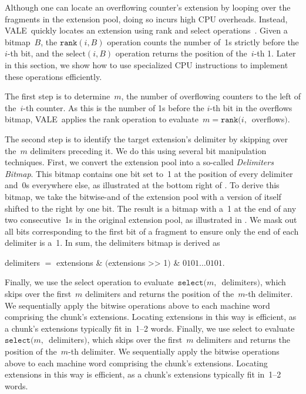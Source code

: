 \documentclass[sigconf]{acmart}
\newcommand{\counterencodingabbrv}{VALE}
\begin{document}
Although one can locate an overflowing counter's extension by looping over the
fragments in the extension pool, doing so incurs high CPU overheads. Instead,
\counterencodingabbrv\ quickly locates an extension using rank and select
operations~\cite{Poppy,FlorianRankandSelect,CompactPATTrees,RankandSelectDict,GQF}.
Given a bitmap~$B$, the $\texttt{rank}(i,B)$ operation counts the number of~1s
strictly before the $i$-th bit, and the $\text{select}(i,B)$ operation returns
the position of the~$i${\nobreakdash-}th 1. Later in this section, we show how
to use specialized CPU instructions to implement these operations efficiently. 

The first step is to determine~$m$, the number of overflowing counters to the
left of the~$i${\nobreakdash-}th counter. As this is the number of 1s before
the $i${\nobreakdash-}th bit in the overflows bitmap, \counterencodingabbrv\
applies the rank operation to evaluate~$m=\texttt{rank}(i,$~overflows$)$.

The second step is to identify the target extension's delimiter by skipping
over the~$m$ delimiters preceding it. We do this using several bit manipulation
techniques. First, we convert the extension pool into a so-called
\emph{Delimiters Bitmap}. This bitmap contains one bit set to~1 at the position
of every delimiter and~0s everywhere else, as illustrated at the bottom right
of
.
To derive this bitmap, we take the bitwise-and of the extension pool with a
version of itself shifted to the right by one bit. The result is a bitmap with
a~1 at the end of any two consecutive~1s in the original extension pool, as
illustrated in
.
We mask out all bits corresponding to the first bit of a fragment to ensure
only the end of each delimiter is a~1. In sum, the delimiters bitmap is derived
as
\begin{center}
    delimiters $=$ extensions \& $($extensions >‌> 1$)$ \& $0101\dots0101$.
\end{center}
\iftods
Finally, we use the select operation to evaluate~$\texttt{select}(m,$~delimiters$)$, which skips over the first~$m$ delimiters and returns the position of the~$m${\nobreakdash-}th delimiter.
We sequentially apply the bitwise operations above to each machine word comprising the chunk's extensions.
Locating extensions in this way is efficient, as a chunk's extensions typically fit in~1--2 words. 
\else
Finally, we use select to evaluate~$\texttt{select}(m,$~delimiters$)$, which skips over the first~$m$ delimiters and returns the position of the~$m${\nobreakdash-}th delimiter.
We sequentially apply the bitwise operations above to each machine word comprising the chunk's extensions.
Locating extensions in this way is efficient, as a chunk's extensions typically fit in~1--2 words. 
\fi
\end{document}

